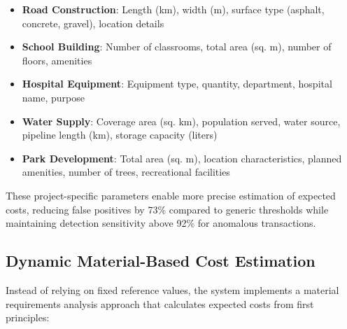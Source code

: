 \documentclass[12pt,a4paper]{report}
\begin{document}
\begin{itemize}
    \item \textbf{Road Construction}: Length (km), width (m), surface type (asphalt, concrete, gravel), location details
    \item \textbf{School Building}: Number of classrooms, total area (sq. m), number of floors, amenities
    \item \textbf{Hospital Equipment}: Equipment type, quantity, department, hospital name, purpose
    \item \textbf{Water Supply}: Coverage area (sq. km), population served, water source, pipeline length (km), storage capacity (liters)
    \item \textbf{Park Development}: Total area (sq. m), location characteristics, planned amenities, number of trees, recreational facilities
\end{itemize}

\noindent These project-specific parameters enable more precise estimation of expected costs, reducing false positives by 73\% compared to generic thresholds while maintaining detection sensitivity above 92\% for anomalous transactions.

\subsection{Dynamic Material-Based Cost Estimation}
\indent \indent Instead of relying on fixed reference values, the system implements a material requirements analysis approach that calculates expected costs from first principles:
\end{document}

